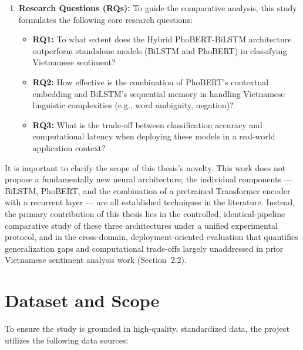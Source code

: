 \documentclass[12pt]{report} %
\begin{document}
\begin{enumerate}
    \item \textbf{Research Questions (RQs):}
          To guide the comparative analysis, this study formulates the following core research questions:
          \begin{itemize}
              \item \textbf{RQ1:} To what extent does the Hybrid PhoBERT-BiLSTM architecture outperform standalone models (BiLSTM and PhoBERT) in classifying Vietnamese sentiment?
              \item \textbf{RQ2:} How effective is the combination of PhoBERT's contextual embedding and BiLSTM's sequential memory in handling Vietnamese linguistic complexities (e.g., word ambiguity, negation)?
              \item \textbf{RQ3:} What is the trade-off between classification accuracy and computational latency when deploying these models in a real-world application context?
          \end{itemize}
\end{enumerate}

It is important to clarify the scope of this thesis's novelty. This work does not propose a fundamentally new neural architecture; the individual components --- BiLSTM, PhoBERT, and the combination of a pretrained Transformer encoder with a recurrent layer --- are all established techniques in the literature. Instead, the primary contribution of this thesis lies in the controlled, identical-pipeline comparative study of these three architectures under a unified experimental protocol, and in the cross-domain, deployment-oriented evaluation that quantifies generalization gaps and computational trade-offs largely unaddressed in prior Vietnamese sentiment analysis work (Section~2.2).

\section{Dataset and Scope}
To ensure the study is grounded in high-quality, standardized data, the project utilizes the following data sources:
\end{document}
